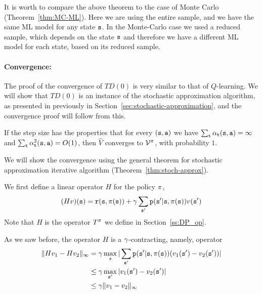 It is worth to compare the above theorem to the case of Monte Carlo
(Theorem~\ref{thm:MC-ML}). Here we are using the entire sample, and
we have the same ML model for any state ${\tt s}$. In the Monte-Carlo
case we used a reduced sample, which depends on the state ${\tt s}$
and therefore we have a different ML model for each state, based on
its reduced sample.

\paragraph{Convergence:} The proof of the convergence of $TD(0)$ is very
similar to that of $Q$-learning. We will show that $TD(0)$ is an
instance of the stochastic approximation algorithm, as presented in
previously in Section~\ref{sec:stochastic-approximation}, and the
convergence proof will follow from this.

\begin{theorem}[Convergence $TD(0)$]
\label{thm:TD0-conrg} If the step size has the properties that for
every $({\tt s},{\tt a})$ we have $\sum_{\tt t}
\alpha_{\tt t}({\tt s},{\tt a})=\infty $ and $\sum_{\tt t}
\alpha_{\tt t}^2({\tt s},{\tt a})=O(1)$, then $\widehat{V}$ converges
to $\mathcal{V}^\pi$, with probability $1$.
\end{theorem}

We will show the convergence using the general theorem for
stochastic approximation iterative algorithm
(Theorem~\ref{thm:stoch-approx}).

We first define a linear operator $H$ for the policy $\pi$,
\[
(Hv)({\tt s})={\tt r}({\tt s},\pi({\tt s}))+\gamma\sum_{{\tt s}'}{\tt p}({\tt s}'|{\tt s},\pi({\tt s}))v({\tt s}')
\]
Note that $H$ is the operator $T^\pi$ we define in
Section~\ref{ss:DP_op}.

As we saw before, the operator $H$ is a $\gamma$-contracting, namely,
operator
\begin{align*}
\|Hv_1-Hv_2\|_\infty &= \gamma \max_{s} |
\sum_{{\tt s}'}{\tt p}({\tt s}'|{\tt s},\pi({\tt s}))(v_1({\tt s}')-v_2({\tt s}'))|\\
&\leq \gamma\max_{{\tt s}'} |v_1({\tt s}')-v_2({\tt s}')|\\
&\leq \gamma \|v_1-v_2\|_\infty
\end{align*}

